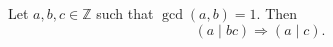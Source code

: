 \documentclass[preview]{standalone}
\begin{document}
\begin{center}
Let $a, b, c \in \mathbb{Z}$ such that $\gcd(a, b) = 1$. Then \\\[(a \mid bc) \Rightarrow (a \mid c).\]
\end{center}
\end{document}
